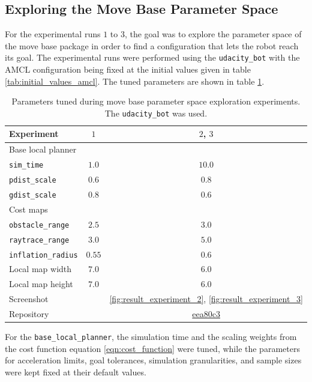 \documentclass[10pt,journal,compsoc]{IEEEtran}
\begin{document}
\subsection{Exploring the Move Base Parameter Space}
\label{sec:move_base_experiments}
For the experimental runs $1$ to $3$, the goal was to explore the parameter space of the move base package in order to find a configuration that lets the robot reach its goal. The experimental runs were performed using the \texttt{udacity\_bot} with the AMCL configuration being fixed at the initial values given in table \ref{tab:initial_values_amcl}. The tuned parameters are shown in table \ref{tab:move_base_experiments}.

\begin{table}[thbp]
\caption{Parameters tuned during move base parameter space exploration experiments. The \texttt{udacity\_bot} was used.}
\label{tab:move_base_experiments}
\begin{center}
\renewcommand{\arraystretch}{1.3}
\begin{tabular}{|l|c|c|}
\hline
Experiment & $1$ & $2$, $3$ \\
\hline
\multicolumn{3}{|l|}{Base local planner} \\
\hline
\texttt{sim\_time}    & $1.0$ & $10.0$  \\
\texttt{pdist\_scale} & $0.6$ &  $0.8$  \\
\texttt{gdist\_scale} & $0.8$ &  $0.6$  \\
\hline
\multicolumn{3}{|l|}{Cost maps} \\
\hline
\texttt{obstacle\_range}   & $2.5$  & $3.0$  \\
\texttt{raytrace\_range}   & $3.0$  & $5.0$  \\
\texttt{inflation\_radius} & $0.55$ & $0.6$  \\
Local map width            & $7.0$  & $6.0$  \\
Local map height           & $7.0$  & $6.0$  \\
\hline 
Screenshot & & \ref{fig:result_experiment_2},  \ref{fig:result_experiment_3}\\
\hline
Repository & & \href{https://github.com/S2H-Mobile/RoboND-Localization-Project/tree/eea80c389c23bcb5522f89777ab40a6292e0076f}{eea80c3}\\
\hline
\end{tabular}
\end{center}
\end{table}

For the \texttt{base\_local\_planner}, the simulation time and the scaling weights from the cost function equation \ref{eqn:cost_function} were tuned, while the parameters for acceleration limits, goal tolerances, simulation granularities, and sample sizes were kept fixed at their default values.
\end{document}
